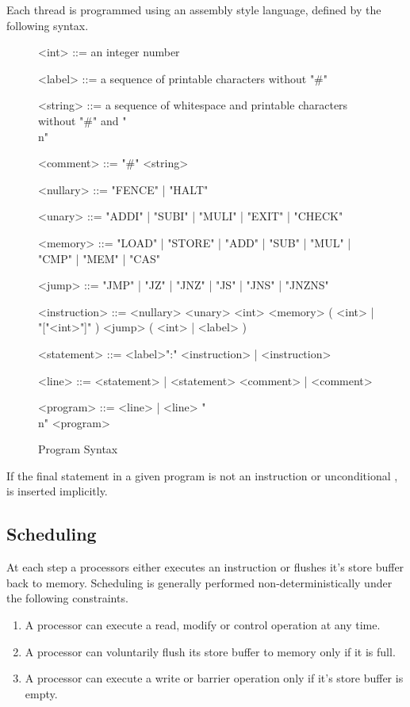 Each thread is programmed using an assembly style language, defined by the following syntax.

\begin{figure}[!h]
\begin{grammar}
\small

<int> ::= an integer number

<label> ::= a sequence of printable characters without "#"

<string> ::= a sequence of whitespace and printable characters without "#" and "\\n"

<comment> ::= "#" <string>

<nullary> ::= "FENCE" | "HALT"

<unary> ::= "ADDI" | "SUBI" | "MULI" | "EXIT" | "CHECK"

<memory> ::= "LOAD" | "STORE" | "ADD" | "SUB" | "MUL" | "CMP" | "MEM" | "CAS"

<jump> ::= "JMP" | "JZ" | "JNZ" | "JS" | "JNS" | "JNZNS"

<instruction> ::= <nullary>
\alt <unary> <int>
\alt <memory> ( <int> | "["<int>"]" )
\alt <jump> ( <int> | <label> )

<statement> ::= <label>":" <instruction> | <instruction>

<line> ::= <statement> | <statement> <comment> | <comment>

<program> ::= <line> | <line> "\\n" <program>
\end{grammar}
\caption{Program Syntax}
\label{fig:syntax:program}
\end{figure}

If the final statement in a given program is not an  instruction or unconditional ,   is inserted implicitly.

\subsection{Scheduling}

At each step a processors either executes an instruction or flushes it's store buffer back to memory.
Scheduling is generally performed non-deterministically under the following constraints.

\begin{enumerate}
  \item A processor can execute a read, modify or control operation at any time.
  \item A processor can voluntarily flush its store buffer to memory only if it is full.
  \item A processor can execute a write or barrier operation only if it's store buffer is empty.
\end{enumerate}

